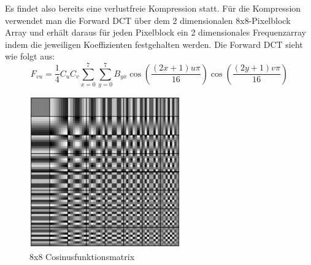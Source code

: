 \documentclass{article}
\begin{document}
Es findet also bereits eine verlustfreie Kompression statt. Für die Kompression verwendet man die Forward DCT über dem 2 dimensionalen 8x8-Pixelblock Array und erhält daraus für jeden Pixelblock ein 2 dimensionales Frequenzarray indem die jeweiligen Koeffizienten festgehalten werden. Die Forward DCT sieht wie folgt aus:
$$F_{vu} = \frac{1}{4} C_u C_v \sum_{x=0}^7 \sum_{y=0}^7 B_{yx} \cos \left( \frac{(2x+1)u\pi}{16} \right) \cos \left( \frac{(2y+1)v\pi}{16} \right)$$
\begin{figure}[h]
		\begin{center}
		\includegraphics[width=6.5cm]{img/dct.png}
		\end{center}
		\caption{8x8 Cosinusfunktionsmatrix}
		\label{fig:8x8 Cosinusfunktionsmatrix}
\end{figure}
\newpage
\end{document}
